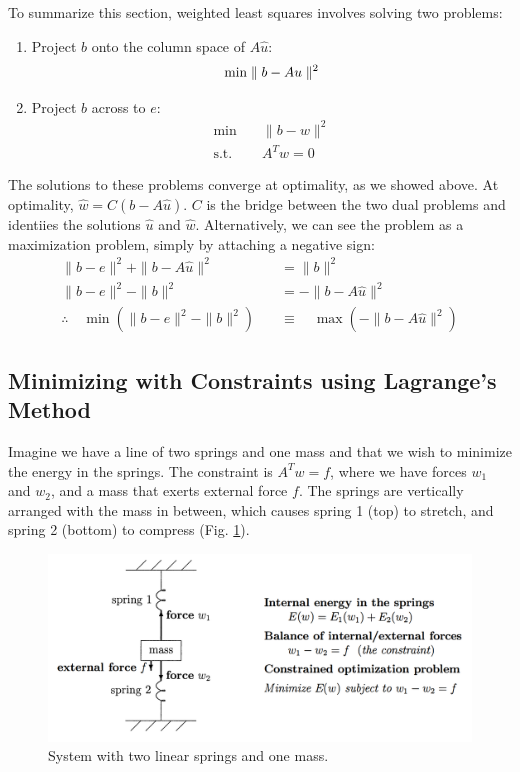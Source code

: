 \documentclass[]{article}
\begin{document}
To summarize this section, weighted least squares involves solving two problems:
\begin{enumerate}
	\item Project $b$ onto the column space of $A\hat{u}$:
	\begin{align*}
	\centering
	\min \parallel b-Au \parallel^2
	\end{align*}
	\item Project $b$ across to $e$: \begin{align*}
		\min &\quad \parallel b-w \parallel^2 \\
		\textrm{s.t.} &\quad A^T w = 0
	\end{align*}
\end{enumerate}

The solutions to these problems converge at optimality, as we showed above. At optimality, $\hat{w} = C(b - A\hat{u})$. $C$ is the bridge between the two dual problems and identiies the solutions $\hat{u}$ and $\hat{w}$. Alternatively, we can see the problem as a maximization problem, simply by attaching a negative sign: 
\begin{align}
	\parallel b - e \parallel^2 + \parallel b - A \hat{u} \parallel^2 &= \parallel b \parallel^2 \\
	\parallel b - e \parallel^2 - \parallel b \parallel^2 &= -\parallel b - A \hat{u} \parallel^2 \\
	\therefore \quad \min (\parallel b-e \parallel^2 - \parallel b \parallel^2) \quad &\equiv \quad \max (-\parallel b - A \hat{u} \parallel^2)
\end{align}

\subsection{Minimizing with Constraints using Lagrange's Method}
Imagine we have a line of two springs and one mass and that we wish to minimize the energy in the springs. The constraint is $A^T w = f$, where we have forces $w_1$ and $w_2$, and a mass that exerts external force $f$. The springs are vertically arranged with the mass in between, which causes spring 1 (top) to stretch, and spring 2 (bottom) to compress (Fig. \ref{fig:strangconstrainedsprings}). 

\begin{figure}[H]
	\centering
	\includegraphics[width=0.8\linewidth]{figs/Strang_constrained_springs}
	\caption{System with two linear springs and one mass.}
	\label{fig:strangconstrainedsprings}
\end{figure}
\end{document}
